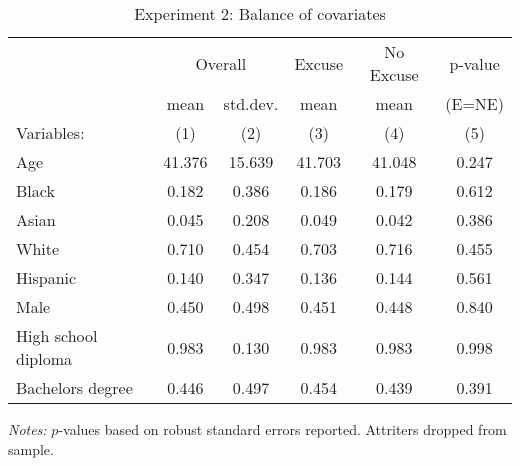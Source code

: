 \begin{table}[!ht]
\centering
\caption{Experiment 2: Balance of covariates}
\label{t:1-balance}
\vspace*{2mm}
\begin{threeparttable}
\begin{tabular}{lccccc}
\toprule
 & \multicolumn{2}{c}{Overall} & Excuse & No Excuse & p-value \\
 \cmidrule(r){2-3} \cmidrule(lr){4-4} \cmidrule(lr){5-5} \cmidrule(lr){6-6} 
 & mean & std.dev. & mean & mean & (E=NE) \\
 \cmidrule(r){2-2} \cmidrule(lr){3-3} \cmidrule(lr){4-4} \cmidrule(lr){5-5} \cmidrule(l){6-6} 
  Variables: & (1) & (2) & (3) & (4) & (5) \\ \midrule \midrule
Age & 41.376 & 15.639 & 41.703 & 41.048 & 0.247 \\
\addlinespace
Black & 0.182 & 0.386 & 0.186 & 0.179 & 0.612 \\
Asian & 0.045 & 0.208 & 0.049 & 0.042 & 0.386 \\
White & 0.710 & 0.454 & 0.703 & 0.716 & 0.455 \\
Hispanic & 0.140 & 0.347 & 0.136 & 0.144 & 0.561 \\
\addlinespace
Male & 0.450 & 0.498 & 0.451 & 0.448 & 0.840 \\
\addlinespace
High school diploma & 0.983 & 0.130 & 0.983 & 0.983 & 0.998 \\
Bachelors degree & 0.446 & 0.497 & 0.454 & 0.439 & 0.391 \\
 \midrule
\bottomrule
\end{tabular}
\begin{tablenotes}[flushleft] \footnotesize
\item \textit{Notes: }$p$-values based on robust standard errors reported. Attriters dropped from sample.
\end{tablenotes} \end{threeparttable} \end{table}
